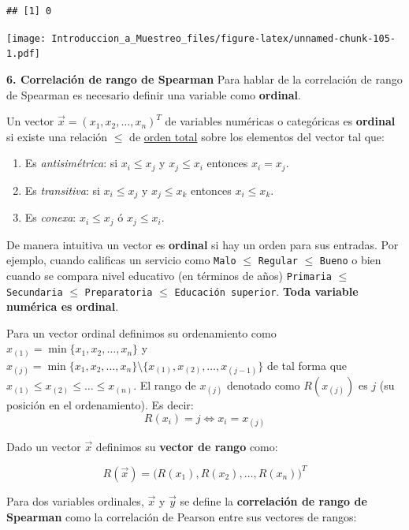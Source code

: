 \documentclass[
]{book}
\begin{document}
\begin{verbatim}
## [1] 0
\end{verbatim}

\texttt{[image: Introduccion\_a\_Muestreo\_files/figure-latex/unnamed-chunk-105-1.pdf]}

\textbf{6. Correlación de rango de Spearman} Para hablar de la correlación de rango de Spearman es necesario definir una variable como \textbf{ordinal}.

Un vector \(\vec{x} = (x_1, x_2, \dots, x_n)^T\) de variables numéricas o categóricas es \textbf{ordinal} si existe una relación \(\leq\) de \href{https://en.wikipedia.org/wiki/Total_order}{orden total} sobre los elementos del vector tal que:

\begin{enumerate}
\def\labelenumi{\arabic{enumi}.}
\item
  Es \emph{antisimétrica}: si \(x_i \leq x_j\) y \(x_j \leq x_i\) entonces \(x_i = x_j\).
\item
  Es \emph{transitiva}: si \(x_i \leq x_j\) y \(x_j \leq x_k\) entonces \(x_i \leq x_k\).
\item
  Es \emph{conexa}: \(x_i \leq x_j\) ó \(x_j \leq x_i\).
\end{enumerate}

De manera intuitiva un vector es \textbf{ordinal} si hay un orden para sus entradas. Por ejemplo, cuando calificas un servicio como \texttt{Malo} \(\leq\) \texttt{Regular} \(\leq\) \texttt{Bueno} o bien cuando se compara nivel educativo (en términos de años) \texttt{Primaria} \(\leq\) \texttt{Secundaria} \(\leq\) \texttt{Preparatoria} \(\leq\) \texttt{Educación\ superior}. \textbf{Toda variable numérica es ordinal}.

Para un vector ordinal definimos su ordenamiento como \(x_{(1)} = \min \{ x_1, x_2, \dots, x_n \}\) y \(x_{(j)} = \min \{ x_1, x_2, \dots, x_n \} \setminus \{ x_{(1)}, x_{(2)}, \dots, x_{(j-1)} \}\) de tal forma que \(x_{(1)} \leq x_{(2)} \leq \dots \leq x_{(n)}\). El rango de \(x_{(j)}\) denotado como \(R(x_{(j)})\) es \(j\) (su posición en el ordenamiento). Es decir:
\[
R(x_i) = j \Leftrightarrow x_i = x_{(j)}
\]

Dado un vector \(\vec{x}\) definimos su \textbf{vector de rango} como:

\[
R(\vec{x}) = \big( R(x_1), R(x_2), \dots, R(x_n) )^T
\]

Para dos variables ordinales, \(\vec{x}\) y \(\vec{y}\) se define la \textbf{correlación de rango de Spearman} como la correlación de Pearson entre sus vectores de rangos:
\end{document}
